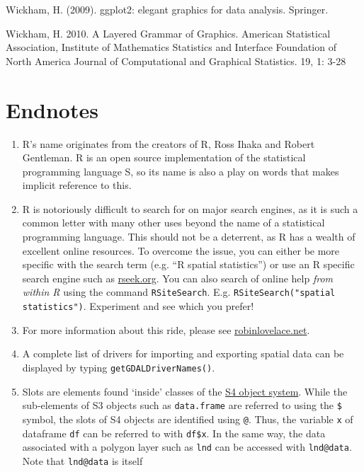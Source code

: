 \documentclass[]{article}
\begin{document}
Wickham, H. (2009). ggplot2: elegant graphics for data analysis.
Springer.

Wickham, H. 2010. A Layered Grammar of Graphics. American Statistical
Association, Institute of Mathematics Statistics and Interface
Foundation of North America Journal of Computational and Graphical
Statistics. 19, 1: 3-28

\section{Endnotes}

\begin{enumerate}[1.]
\item
  R's name originates from the creators of R, Ross Ihaka and Robert
  Gentleman. R is an open source implementation of the statistical
  programming language S, so its name is also a play on words that makes
  implicit reference to this.
\item
  R is notoriously difficult to search for on major search engines, as
  it is such a common letter with many other uses beyond the name of a
  statistical programming language. This should not be a deterrent, as R
  has a wealth of excellent online resources. To overcome the issue, you
  can either be more specific with the search term (e.g. ``R spatial
  statistics'') or use an R specific search engine such as
  \href{http://www.rseek.org/}{rseek.org}. You can also search of online
  help \emph{from within R} using the command \texttt{RSiteSearch}. E.g.
  \texttt{RSiteSearch("spatial statistics")}. Experiment and see which
  you prefer!
\item
  For more information about this ride, please see
  \href{http://robinlovelace.net/ecotech/2013/10/13/bicycle-trailer-move.html}{robinlovelace.net}.
\item
  A complete list of drivers for importing and exporting spatial data
  can be displayed by typing \texttt{getGDALDriverNames()}.
\item
  Slots are elements found `inside' classes of the
  \href{http://adv-r.had.co.nz/S4.html}{S4 object system}. While the
  sub-elements of S3 objects such as \texttt{data.frame} are referred to
  using the \texttt{\$} symbol, the slots of S4 objects are identified
  using \texttt{@}. Thus, the variable \texttt{x} of dataframe
  \texttt{df} can be referred to with \texttt{df\$x}. In the same way,
  the data associated with a polygon layer such as \texttt{lnd} can be
  accessed with \texttt{lnd@data}. Note that \texttt{lnd@data} is itself

\end{enumerate}
\end{document}
